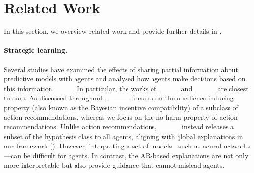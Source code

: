 \section{Related Work}
In this section, we overview related work and provide further details in .



\paragraph{Strategic learning.} Several studies have examined the effects of sharing partial information about predictive models with agents and analysed how agents make decisions based on this information____. 
In particular, the works of ____ and ____ are closest to ours. As discussed throughout , ____ focuses on the obedience-inducing property (also known as the Bayesian incentive compatibility) of a subclass of action recommendations, whereas we focus on the no-harm property of action recommendations. 
Unlike action recommendations, ____ instead releases a subset of the hypothesis class to all agents, aligning with global explanations in our framework (). However, interpreting a set of models—such as neural networks—can be difficult for agents. In contrast, the AR-based explanations are not only more interpretable but also provide guidance that cannot mislead agents.



